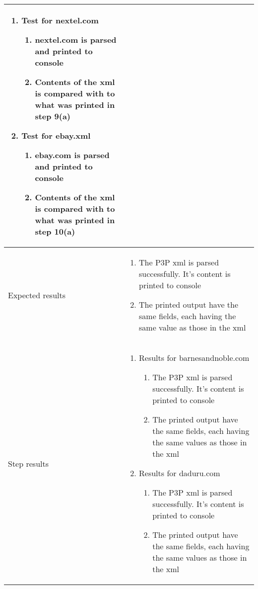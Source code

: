 \begin{center}
\begin{longtable}{ | p{4cm} | p{10cm} | }
\begin{enumerate}
							\item Test for nextel.com
							\begin{enumerate}
								\item nextel.com is parsed and printed to console
								\item Contents of the xml is compared with to what was printed in step 9(a)
							\end{enumerate}

							\item Test for ebay.xml
							\begin{enumerate}
								\item ebay.com is parsed and printed to console
								\item Contents of the xml is compared with to what was printed in step 10(a)
							\end{enumerate}
						\end{enumerate} \\ [3pt] \hline
			
			Expected results &	\begin{enumerate}
							\item The P3P xml is parsed successfully. It's content is printed to console
							\item The printed output have the same fields, each having the same value as those in the xml
						\end{enumerate}
							 \\  [3pt] \hline

			Step results & 	\begin{enumerate}
							\item Results for barnesandnoble.com
							\begin{enumerate}
								\item The P3P xml is parsed successfully. It's content is printed to console
								\item The printed output have the same fields, each having the same values as those in the xml
							\end{enumerate}

							\item Results for daduru.com
							\begin{enumerate}
								\item The P3P xml is parsed successfully. It's content is printed to console
								\item The printed output have the same fields, each having the same values as those in the xml
							\end{enumerate}


\end{enumerate}
\end{longtable}
\end{center}
